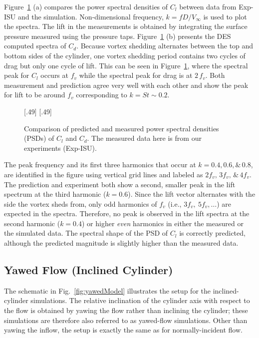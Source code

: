 Figure~\ref{fig:St_Compared_Re20k} (a) compares the power spectral densities of
$C_l$ between data from Exp-ISU and the simulation. Non-dimensional frequency,
$k=fD/V_\infty$ is used to plot the spectra. The lift in the measurements is
obtained by integrating the surface pressure measured using the pressure taps.
Figure~\ref{fig:St_Compared_Re20k} (b) presents the DES computed spectra of
$C_d$. Because vortex shedding alternates between the top and bottom sides of
the cylinder, one vortex shedding period contains two cycles of drag but only
one cycle of lift. This can be seen in Figure~\ref{fig:St_Compared_Re20k},
where the spectral peak for $C_l$ occurs at $f_v$ while the spectral peak for
drag is at $2\,f_v$. Both measurement and prediction agree very well with
each other and show the peak for lift to be around $f_v$ corresponding to
$k=St\sim0.2$.
%
\begin{figure}[htb!]
  \centering
    [.49\linewidth]{}
  \hspace*{\fill}
    [.49\linewidth]{}
    \caption{Comparison of predicted and measured power spectral densities
      (PSDs) of $C_l$ and $C_d$. The
      measured data here is from our experiments (Exp-ISU).}
\label{fig:St_Compared_Re20k}
\end{figure}

The peak frequency and its first three harmonics that occur at $k = 0.4, 0.6,
\& \,0.8$, are identified in the figure using vertical grid lines and labeled
as $2f_v,\,3f_v,\,\&\,4f_v$. The prediction and experiment both show a second,
smaller peak in the lift spectrum at the third harmonic ($k=0.6$).  Since the
lift vector alternates with the side the vortex sheds from, only odd harmonics
of $f_v$ (i.e., $3f_v,~5f_v,\ldots$) are expected in the spectra. Therefore, no
peak is observed in the lift spectra at the second harmonic ($k=0.4$) or higher
{\em even} harmonics in either the measured or the simulated data. The spectral
shape of the PSD of $C_l$ is correctly predicted, although the predicted
magnitude is slightly higher than the measured data.

\subsection{Yawed Flow (Inclined Cylinder)}
\label{sec:inclined_cylinder}
%
The schematic in Fig.~\ref{fig:yawedModel} illustrates the setup for the
inclined-cylinder simulations. The relative inclination of the cylinder axis
with respect to the flow is obtained by yawing the flow rather than inclining
the cylinder; these simulations are therefore also referred to as yawed-flow
simulations. Other than yawing the inflow, the setup is exactly the same as for
normally-incident flow.

